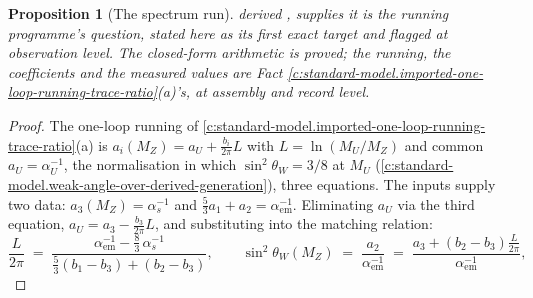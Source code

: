 \documentclass[11pt]{article}
\newtheorem{proposition}[theorem]{Proposition}
\theoremstyle{definition}
\theoremstyle{plain}
\begin{document}
\begin{proposition}[The spectrum run]
derived \cite{ButlerT3, ButlerT14}, supplies it is the running programme's question, stated here as its first exact target and flagged at observation level. The closed-form arithmetic is proved; the running, the coefficients and the measured values are Fact \ref{c:standard-model.imported-one-loop-running-trace-ratio}(a)'s, at assembly and record level.
\end{proposition}
\begin{proof}
The one-loop running of \ref{c:standard-model.imported-one-loop-running-trace-ratio}(a) is $a_{i}(M_{Z}) = a_{U} + \tfrac{b_{i}}{2\pi} L$ with $L = \ln(M_{U}/M_{Z})$ and common $a_{U} = \alpha_{U}^{-1}$, the normalisation in which $\sin^{2}\theta_{W} = 3/8$ at $M_{U}$ (\ref{c:standard-model.weak-angle-over-derived-generation}), three equations. The inputs supply two data: $a_{3}(M_{Z}) = \alpha_{s}^{-1}$ and $\tfrac53 a_{1} + a_{2} = \alpha_{\mathrm{em}}^{-1}$. Eliminating $a_{U}$ via the third equation, $a_{U} = a_{3} - \tfrac{b_{3}}{2\pi}L$, and substituting into the matching relation:
\[
\frac{L}{2\pi} \;=\; \frac{\alpha_{\mathrm{em}}^{-1} - \tfrac83\, \alpha_{s}^{-1}}{\tfrac53(b_{1} - b_{3}) + (b_{2} - b_{3})},
\qquad
\sin^{2}\theta_{W}(M_{Z}) \;=\; \frac{a_{2}}{\alpha_{\mathrm{em}}^{-1}} \;=\; \frac{a_{3} + (b_{2} - b_{3})\tfrac{L}{2\pi}}{\alpha_{\mathrm{em}}^{-1}},
\]

\end{proof}
\end{document}
